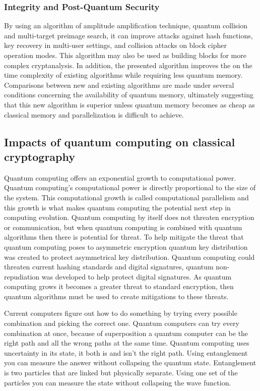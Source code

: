 \documentclass[sigconf]{acmart}
\begin{document}
\subsubsection{Integrity and Post-Quantum Security} %
By using an algorithm of amplitude amplification technique, quantum collision and multi-target preimage search, it can improve attacks against hash functions, key recovery in multi-user settings, and collision attacks on block cipher operation modes. This algorithm may also be used as building blocks for more complex cryptanalysis. In addition, the presented algorithm improves the on the time complexity of existing algorithms while requiring less quantum memory. Comparisons between new and existing algorithms are made under several conditions concerning the availability of quantum memory, ultimately suggesting that this new algorithm is superior unless quantum memory becomes as cheap as classical memory and parallelization is difficult to achieve\cite{chailloux_efficient_2017}.

\subsection{Impacts of quantum computing on classical cryptography}
Quantum computing offers an exponential growth to computational power. Quantum computing's computational power is directly proportional to the size of the system. This computational growth is called computational parallelism and this growth is what makes quantum computing the potential next step in computing evolution. Quantum computing by itself does not threaten encryption or communication, but when quantum computing is combined with quantum algorithms then there is potential for threat. To help mitigate the threat that quantum computing poses to asymmetric encryption quantum key distribution was created to protect asymmetrical key distribution. Quantum computing could threaten current hashing standards and digital signatures, quantum non-repudiation was developed to help protect digital signatures. As quantum computing grows it becomes a greater threat to standard encryption, then quantum algorithms must be used to create mitigations to these threats.

Current computers figure out how to do something by trying every possible combination and picking the correct one. Quantum computers can try every combination at once, because of superposition a quantum computer can be the right path and all the wrong paths at the same time. Quantum computing uses uncertainty in its state, it both is and isn't the right path. Using entanglement you can measure the answer without collapsing the quantum state. Entanglement is two particles that are linked but physically separate. Using one set of the particles you can measure the state without collapsing the wave function.
\end{document}
